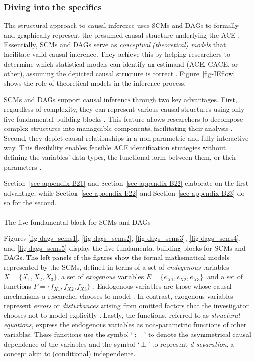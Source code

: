 \documentclass[
  authoryear,
  review,
  1p]{elsarticle}
\makeatletter
\let\oldparagraph\paragraph
\renewcommand{\paragraph}{
    \@ifstar
      \xxxParagraphStar
      \xxxParagraphNoStar
  }
\newcommand{\xxxParagraphStar}[1]{\oldparagraph*{#1}\mbox{}}
\newcommand{\xxxParagraphNoStar}[1]{\oldparagraph{#1}\mbox{}}
\makeatother
\begin{document}
\subsubsection{Diving into the specifics}\label{sec-appendix-B2}

The structural approach to causal inference uses SCMs and DAGs to
formally and graphically represent the presumed causal structure
underlying the ACE
\citep{Pearl_2009, Pearl_et_al_2016, Gross_et_al_2018, Neal_2020}.
Essentially, SCMs and DAGs serve as \emph{conceptual (theoretical)
models} that facilitate valid causal inference. They achieve this by
helping researchers to determine which statistical models can identify
an estimand (ACE, CACE, or other), assuming the depicted causal
structure is correct \citep{McElreath_2020}. Figure~\ref{fig-IEflow}
shows the role of theoretical models in the inference process.

SCMs and DAGs support causal inference through two key advantages.
First, regardless of complexity, they can represent various causal
structures using only five fundamental building blocks
\citep{Neal_2020, McElreath_2020}. This feature allows researchers to
decompose complex structures into manageable components, facilitating
their analysis \citep{McElreath_2020}. Second, they depict causal
relationships in a non-parametric and fully interactive way. This
flexibility enables feasible ACE identification strategies without
defining the variables' data types, the functional form between them, or
their parameters \citep[pp.~35]{Pearl_et_al_2016}.

Section~\ref{sec-appendix-B21} and Section~\ref{sec-appendix-B22}
elaborate on the first advantage, while Section~\ref{sec-appendix-B22}
and Section~\ref{sec-appendix-B23} do so for the second.

\paragraph{The five fundamental block for SCMs and
DAGs}\label{sec-appendix-B21}

Figures \ref{fig-dags_scms1}, \ref{fig-dags_scms2},
\ref{fig-dags_scms3}, \ref{fig-dags_scms4}, and \ref{fig-dags_scms5}
display the five fundamental building blocks for SCMs and DAGs. The left
panels of the figures show the formal mathematical models, represented
by the SCMs, defined in terms of a set of \emph{endogenous} variables
\(X=\{X_{1},X_{2},X_{3}\}\), a set of \emph{exogenous} variables
\(E=\{e_{X1},e_{X2},e_{X3}\}\), and a set of functions
\(F=\{f_{X1},f_{X2},f_{X3}\}\) \citep{Pearl_2009, Cinelli_et_al_2020}.
Endogenous variables are those whose causal mechanisms a researcher
chooses to model \citep{Neal_2020}. In contrast, exogenous variables
represent \emph{errors} or \emph{disturbances} arising from omitted
factors that the investigator chooses not to model explicitly
\citep[pp.~27,68]{Pearl_2009}. Lastly, the functions, referred to as
\emph{structural equations}, express the endogenous variables as
non-parametric functions of other variables. These functions use the
symbol `\(:=\)' to denote the asymmetrical causal dependence of the
variables and the symbol `\(\:\bot\:\)' to represent
\emph{d-separation}, a concept akin to (conditional) independence.
\end{document}
